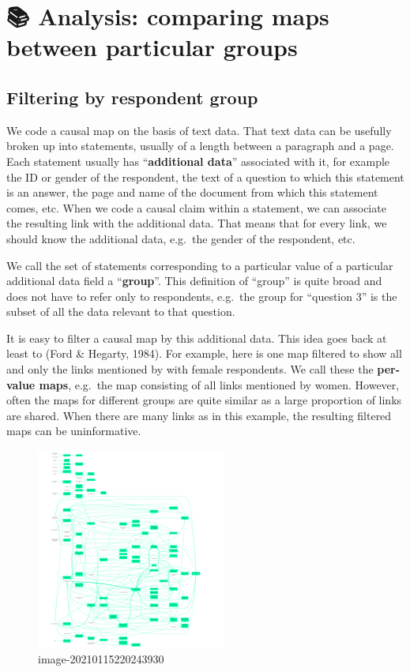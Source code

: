 \documentclass[
]{book}
\begin{document}
\hypertarget{comparing}{%
\chapter{📚 Analysis: comparing maps between particular groups}\label{comparing}}

\hypertarget{filtering-by-respondent-group}{%
\section{Filtering by respondent group}\label{filtering-by-respondent-group}}

We code a causal map on the basis of text data. That text data can be usefully broken up into statements, usually of a length between a paragraph and a page. Each statement usually has ``\textbf{additional data}'' associated with it, for example the ID or gender of the respondent, the text of a question to which this statement is an answer, the page and name of the document from which this statement comes, etc. When we code a causal claim within a statement, we can associate the resulting link with the additional data. That means that for every link, we should know the additional data, e.g.~the gender of the respondent, etc.

We call the set of statements corresponding to a particular value of a particular additional data field a ``\textbf{group}''. This definition of ``group'' is quite broad and does not have to refer only to respondents, e.g.~the group for ``question 3'' is the subset of all the data relevant to that question.

It is easy to filter a causal map by this additional data. This idea goes back at least to (Ford \& Hegarty, 1984). For example, here is one map filtered to show all and only the links mentioned by with female respondents. We call these the \textbf{per-value maps}, e.g.~the map consisting of all links mentioned by women. However, often the maps for different groups are quite similar as a large proportion of links are shared. When there are many links as in this example, the resulting filtered maps can be uninformative.

\begin{figure}
\centering
\includegraphics{_assets/image-20210115220243930.png}
\caption{image-20210115220243930}
\end{figure}
\end{document}
